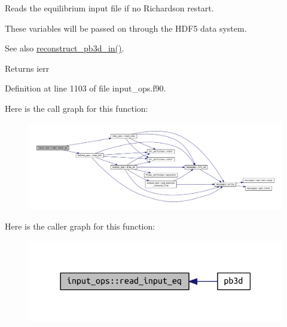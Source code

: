 Reads the equilibrium input file if no Richardson restart. 

These variables will be passed on through the H\+D\+F5 data system.

\begin{DoxySeeAlso}{See also}
\hyperlink{namespacepb3d__ops_ad1481747b9b9832f816d4bf1dd2d6737}{reconstruct\+\_\+pb3d\+\_\+in()}.
\end{DoxySeeAlso}
\begin{DoxyReturn}{Returns}
ierr 
\end{DoxyReturn}


Definition at line 1103 of file input\+\_\+ops.\+f90.

Here is the call graph for this function\+:\nopagebreak
\begin{figure}[H]
\begin{center}
\leavevmode
\includegraphics[width=350pt]{namespaceinput__ops_a577c897cc266961eb40bb5ef747fa077_cgraph}
\end{center}
\end{figure}
Here is the caller graph for this function\+:\nopagebreak
\begin{figure}[H]
\begin{center}
\leavevmode
\includegraphics[width=318pt]{namespaceinput__ops_a577c897cc266961eb40bb5ef747fa077_icgraph}
\end{center}
\end{figure}
\mbox{\label{namespaceinput__ops_a434acca4f59f9dc1d91e04f846133684}} 
